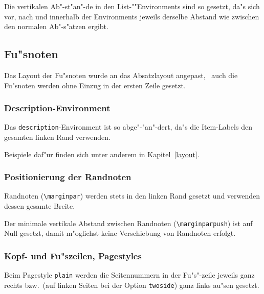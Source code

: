 Die vertikalen Ab"-st"an"-de in den List-""Environments sind so 
gesetzt, da"s sich vor, nach und innerhalb der Environments jeweils 
derselbe Abstand wie zwischen den normalen Ab"-s"atzen ergibt.

\subsection{Fu"snoten}

Das Layout der Fu"snoten wurde an das Absatzlayout angepast, \dH\ auch 
die Fu"snoten werden ohne Einzug in der ersten Zeile gesetzt.

\subsubsection{Description-Environment}

Das {\tt description}-Environment ist so abge"-"an"-dert, da"s 
die Item-Labels den gesamten linken Rand verwenden.

\seealso{\ref{layout}}
Beispiele daf"ur finden sich unter anderem in Kapitel~\ref{layout}.

\subsubsection{Positionierung der Randnoten}

Randnoten (\verb|\marginpar|) werden stets in den linken Rand gesetzt
und verwenden dessen gesamte Breite.

Der minimale vertikale Abstand zwischen Randnoten 
(\verb|\marginparpush|) ist auf Null gesetzt, damit m"oglichst keine 
Verschiebung von Randnoten erfolgt.


\subsubsection{Kopf- und Fu"szeilen, Pagestyles} \label{pagestyle}

Beim Pagestyle {\tt plain} werden die Seitennummern in der 
Fu"s"-zeile jeweils ganz rechts bzw.\ (auf linken Seiten bei der Option 
{\tt twoside}) ganz links au"sen gesetzt.


